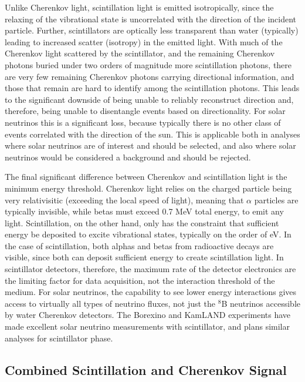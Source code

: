 Unlike Cherenkov light, scintillation light is emitted isotropically, since the relaxing of the vibrational state is uncorrelated with the direction of the incident particle.
Further, scintillators are optically less transparent than water (typically) leading to increased scatter (isotropy) in the emitted light.
With much of the Cherenkov light scattered by the scintillator, and the remaining Cherenkov photons buried under two orders of magnitude more scintillation photons, there are very few remaining Cherenkov photons carrying directional information, and those that remain are hard to identify among the scintillation photons.
This leads to the significant downside of being unable to reliably reconstruct direction and, therefore, being unable to disentangle events based on directionality. 
For solar neutrinos this is a significant loss, because typically there is no other class of events correlated with the direction of the sun.
This is applicable both in analyses where solar neutrinos are of interest and should be selected, and also where solar neutrinos would be considered a background and should be rejected.

The final significant difference between Cherenkov and scintillation light is the minimum energy threshold.
Cherenkov light relies on the charged particle being very relativisitic (exceeding the local speed of light), meaning that $\alpha$ particles are typically invisible, while betas must exceed 0.7 MeV total energy, to emit any light.
Scintillation, on the other hand, only has the constraint that sufficient energy be deposited to excite vibrational states, typically on the order of eV.
In the case of scintillation, both alphas and betas from radioactive decays are visible, since both can deposit sufficient energy to create scintillation light.
In scintillator detectors, therefore, the maximum rate of the detector electronics are the limiting factor for data acquisition, not the interaction threshold of the medium.
For solar neutrinos, the capability to see lower energy interactions gives access to virtually all types of neutrino fluxes, not just the $^8$B neutrinos accessible by water Cherenkov detectors.
The Borexino \cite{borexino} and KamLAND \cite{kamland} experiments have made excellent solar neutrino measurements with scintillator, and {\snop} plans similar analyses for scintillator phase.

\subsection{Combined Scintillation and Cherenkov Signal}

